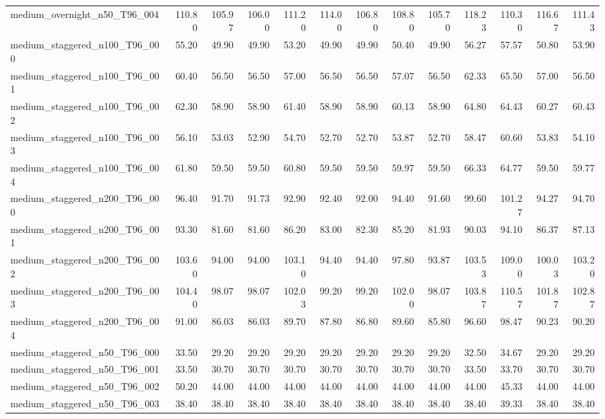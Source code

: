 \begin{table}[htbp]
\begin{tabular}{lrrrrrrrrrrrr}
medium\_overnight\_n50\_T96\_004 & 110.80 & 105.97 & 106.00 & 111.20 & 114.00 & 106.80 & 108.80 & 105.70 & 118.23 & 110.30 & 116.67 & 111.43 \\
medium\_staggered\_n100\_T96\_000 & 55.20 & 49.90 & 49.90 & 53.20 & 49.90 & 49.90 & 50.40 & 49.90 & 56.27 & 57.57 & 50.80 & 53.90 \\
medium\_staggered\_n100\_T96\_001 & 60.40 & 56.50 & 56.50 & 57.00 & 56.50 & 56.50 & 57.07 & 56.50 & 62.33 & 65.50 & 57.00 & 56.50 \\
medium\_staggered\_n100\_T96\_002 & 62.30 & 58.90 & 58.90 & 61.40 & 58.90 & 58.90 & 60.13 & 58.90 & 64.80 & 64.43 & 60.27 & 60.43 \\
medium\_staggered\_n100\_T96\_003 & 56.10 & 53.03 & 52.90 & 54.70 & 52.70 & 52.70 & 53.87 & 52.70 & 58.47 & 60.60 & 53.83 & 54.10 \\
medium\_staggered\_n100\_T96\_004 & 61.80 & 59.50 & 59.50 & 60.80 & 59.50 & 59.50 & 59.97 & 59.50 & 66.33 & 64.77 & 59.50 & 59.77 \\
medium\_staggered\_n200\_T96\_000 & 96.40 & 91.70 & 91.73 & 92.90 & 92.40 & 92.00 & 94.40 & 91.60 & 99.60 & 101.27 & 94.27 & 94.70 \\
medium\_staggered\_n200\_T96\_001 & 93.30 & 81.60 & 81.60 & 86.20 & 83.00 & 82.30 & 85.20 & 81.93 & 90.03 & 94.10 & 86.37 & 87.13 \\
medium\_staggered\_n200\_T96\_002 & 103.60 & 94.00 & 94.00 & 103.10 & 94.40 & 94.40 & 97.80 & 93.87 & 103.53 & 109.00 & 100.03 & 103.20 \\
medium\_staggered\_n200\_T96\_003 & 104.40 & 98.07 & 98.07 & 102.03 & 99.20 & 99.20 & 102.00 & 98.07 & 103.87 & 110.57 & 101.87 & 102.87 \\
medium\_staggered\_n200\_T96\_004 & 91.00 & 86.03 & 86.03 & 89.70 & 87.80 & 86.80 & 89.60 & 85.80 & 96.60 & 98.47 & 90.23 & 90.20 \\
medium\_staggered\_n50\_T96\_000 & 33.50 & 29.20 & 29.20 & 29.20 & 29.20 & 29.20 & 29.20 & 29.20 & 32.50 & 34.67 & 29.20 & 29.20 \\
medium\_staggered\_n50\_T96\_001 & 33.50 & 30.70 & 30.70 & 30.70 & 30.70 & 30.70 & 30.70 & 30.70 & 33.50 & 33.70 & 30.70 & 30.70 \\
medium\_staggered\_n50\_T96\_002 & 50.20 & 44.00 & 44.00 & 44.00 & 44.00 & 44.00 & 44.00 & 44.00 & 44.00 & 45.33 & 44.00 & 44.00 \\
medium\_staggered\_n50\_T96\_003 & 38.40 & 38.40 & 38.40 & 38.40 & 38.40 & 38.40 & 38.40 & 38.40 & 38.40 & 39.33 & 38.40 & 38.40 \\

\end{tabular}
\end{table}
